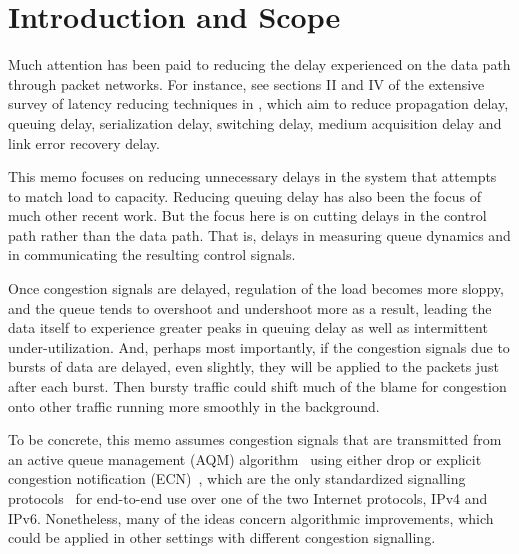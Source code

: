 \section{Introduction and Scope}\label{sigqdyntr_intro}

Much attention has been paid to reducing the delay experienced on the data path through packet networks. For instance, see sections II and IV of the extensive survey of latency reducing techniques in \cite{Briscoe14b:latency_survey}, which aim to reduce propagation delay, queuing delay, serialization delay, switching delay, medium acquisition delay and link error recovery delay.
%

This memo focuses on reducing unnecessary delays in the system that attempts to match load to capacity. Reducing queuing delay has also been the focus of much other recent work. But the focus here is on cutting delays in the control path rather than the data path. That is, delays in measuring queue dynamics and in communicating the resulting control signals.

Once congestion signals are delayed, regulation of the load becomes more sloppy, and the queue tends to overshoot and undershoot more as a result, leading the data itself to experience greater peaks in queuing delay as well as intermittent under-utilization. And, perhaps most importantly, if the congestion signals due to bursts of data are delayed, even slightly, they will be applied to the packets just after each burst. Then bursty traffic could shift much of the blame for congestion onto other traffic running more smoothly in the background.

To be concrete, this memo assumes congestion signals that are transmitted from an active queue management (AQM) algorithm~\cite{Adams13:AQM_survey} using either drop or explicit congestion notification (ECN)~\cite{Floyd94:ECN}, which are the only standardized signalling protocols~\cite{IETF_RFC3168:ECN_IP_TCP} for end-to-end use over one of the two Internet protocols, IPv4 and IPv6. Nonetheless, many of the ideas concern algorithmic improvements, which could be applied in other settings with different congestion signalling.

